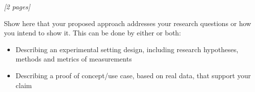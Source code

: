 \textit{[2 pages]}

\noindent
Show here that your proposed approach addresses your research questions or how you intend to show it. This can be done by either or both:

\begin{itemize}
    \item Describing an experimental setting design, including research hypotheses, methods and metrics of measurements 

    \item Describing a proof of concept/use case, based on real data, that support your claim
\end{itemize}


